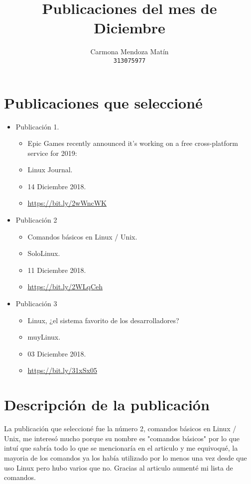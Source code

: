\documentclass[11pt, a4paper]{report}
\begin{document}
\title{Publicaciones del mes de Diciembre}
\author{
  Carmona Mendoza Mat\'in\\
  \texttt{313075977}
}
\date{}
\maketitle

\section*{Publicaciones que seleccioné}
\begin{itemize}

\item Publicación 1.
  \begin{itemize}
  \item Epic Games recently announced it's working on a free cross-platform
    service for 2019:
  \item Linux Journal.
  \item 14 Diciembre 2018.
  \item \url{https://bit.ly/2wWncWK}
  \end{itemize}
  
\item Publicación 2
  \begin{itemize}
  \item Comandos básicos en Linux / Unix.
  \item SoloLinux.
  \item 11 Diciembre 2018. 
  \item \url{https://bit.ly/2WLqCeh}
  \end{itemize}

\item Publicación 3
  \begin{itemize}
  \item Linux, ¿el sistema favorito de los desarrolladores?
  \item muyLinux.
  \item 03 Diciembre 2018.
  \item \url{https://bit.ly/31xSx05}
  \end{itemize}
\end{itemize}  


\section*{Descripción de la publicación}
La publicación que seleccioné fue la número 2, comandos básicos en Linux / Unix,
me interesó mucho porque su nombre es "comandos básicos" por lo que intuí que
sabría todo lo que se mencionaría en el articulo y me equivoqué, la mayoria de
los comandos ya los había utilizado por lo menos una vez desde que uso Linux
pero hubo varios que no. Gracias al articulo aumenté mi lista de comandos. \\
\end{document}
